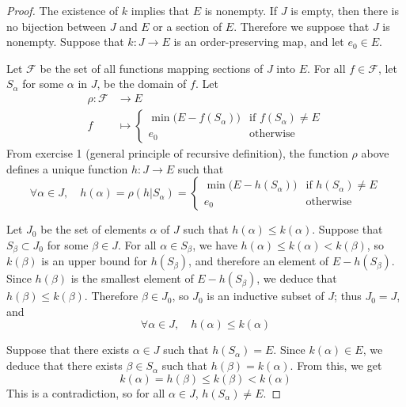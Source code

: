 \documentclass[11pt,a4paper,twoside]{article}
\theoremstyle{definition}
\begin{document}
\begin{proof}

  The existence of $k$ implies that $E$ is nonempty. If $J$ is empty, then there is no bijection between $J$ and $E$
  or a section of $E$. Therefore we suppose that $J$ is nonempty. Suppose that $k : J \to E$ is an order-preserving map,
  and let $e_0 \in E$.

  Let $\mathscr{F}$ be the set of all functions mapping sections of $J$ into $E$. For all $f \in \mathscr{F}$, let $S_\alpha$
  for some $\alpha$ in $J$, be the domain of $f$. Let
  \begin{align*}
    \rho : \mathscr{F} &\to E \\
    f &\mapsto \begin{cases}
      \min \big( E - f ( S_\alpha )  \big) &\text{if } f ( S_\alpha ) \neq E \\
      e_0 &\text{otherwise}
    \end{cases}
  \end{align*}
  From exercise 1 (general principle of recursive definition), the function $\rho$ above defines a unique function $h : J \to E$
  such that
  \begin{equation*}
    \forall \alpha \in J, \quad h ( \alpha ) = \rho ( h | S_\alpha )
    = \begin{cases}
      \min \big( E - h ( S_\alpha ) \big) &\text{if } h ( S_\alpha ) \neq E \\
      e_0 &\text{otherwise}
    \end{cases}
  \end{equation*}

  Let $J_0$ be the set of elements $\alpha$ of $J$ such that $h ( \alpha ) \leq k ( \alpha )$. Suppose that $S_\beta \subset J_0$
  for some $\beta \in J$. For all $\alpha \in S_\beta$, we have $h ( \alpha ) \leq k ( \alpha ) < k ( \beta )$, so $k ( \beta )$
  is an upper bound for $h ( S_\beta )$, and therefore an element of $E - h ( S_\beta )$. Since $h ( \beta )$ is the smallest
  element of $E - h ( S_\beta )$, we deduce that $h ( \beta ) \leq k ( \beta )$. Therefore $\beta \in J_0$, so $J_0$ is an inductive
  subset of $J$; thus $J_0 = J$, and
  \begin{equation*}
    \forall \alpha \in J, \quad h ( \alpha ) \leq k ( \alpha )
  \end{equation*}

  Suppose that there exists $\alpha \in J$ such that $h ( S_\alpha ) = E$. Since $k ( \alpha ) \in E$, we deduce that
  there exists $\beta \in S_\alpha$ such that $h ( \beta ) = k ( \alpha )$. From this, we get
  \begin{equation*}
    k ( \alpha ) = h ( \beta ) \leq k ( \beta ) < k ( \alpha )
  \end{equation*}
  This is a contradiction, so for all $\alpha \in J$, $h ( S_\alpha ) \neq E$.


\end{proof}
\end{document}
